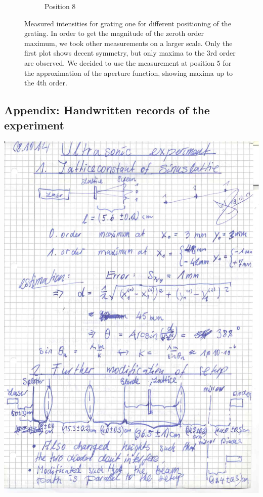 \begin{figure}[H]
\begin{subfigure}[b]{\mpltw}
        \caption{Position 8}
        \label{}
    \end{subfigure}
    \caption{
        Measured intensities for grating one for different positioning of the grating.
        In order to get the magnitude of the zeroth order maximum, we took other measurements 
        on a larger scale. Only the first plot shows decent symmetry, but only 
        maxima to the 3rd order are observed. We decided to use the measurement 
        at position 5 for the approximation of the aperture function, showing maxima 
        up to the 4th order. 
        }
    \label{fig:aperture_positions_detail}
\end{figure}


\subsection{Appendix: Handwritten records of the experiment}
\label{sec:records}
    \includegraphics[width=\linewidth]{appendix/ultra0001.jpg}
